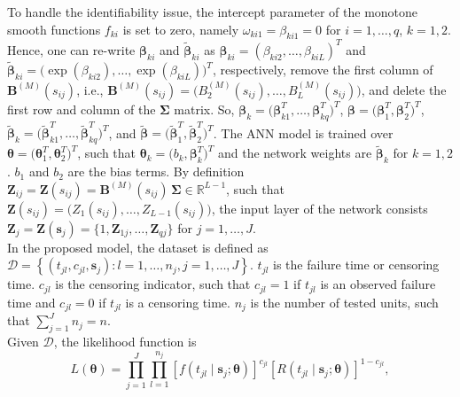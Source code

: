 \documentclass[twoside]{article}
\begin{document}
To handle the identifiability issue, the intercept parameter of the monotone smooth functions $f_{ki}$ is set to zero, namely $\omega_{ki1}=\beta_{ki1}=0$ for $i=1,\ldots,q$, $k=1,2$. Hence, one can re-write $\boldsymbol{\beta}_{ki}$ and $\tilde{\boldsymbol{\beta}}_{ki}$ as $\boldsymbol{\beta}_{ki}=(\beta_{ki2},\ldots,\beta_{kiL})^{T}$ and $\tilde{\boldsymbol{\beta}}_{ki}=\big(\exp(\beta_{ki2}),\ldots,\exp(\beta_{kiL})\big)^{T}$, respectively, remove the first column of $\boldsymbol{B}^{(M)}(s_{ij})$, i.e., $\boldsymbol{B}^{(M)}(s_{ij})=\big(B^{(M)}_{2}(s_{ij}),\ldots,B^{(M)}_{L}(s_{ij})\big)$, and delete the first row and column of the $\boldsymbol{\Sigma}$ matrix. So, $\boldsymbol{\beta}_{k}=\big(\boldsymbol{\beta}^{T}_{k1},\ldots,\boldsymbol{\beta}^{T}_{kq}\big)^{T}$, $\boldsymbol{\beta}=\big(\boldsymbol{\beta}^{T}_{1},\boldsymbol{\beta}^{T}_{2}\big)^{T}$, $\tilde{\boldsymbol{\beta}}_{k}=\big(\tilde{\boldsymbol{\beta}}^{T}_{k1},\ldots,\tilde{\boldsymbol{\beta}}^{T}_{kq}\big)^{T}$, and $\tilde{\boldsymbol{\beta}}=\big(\tilde{\boldsymbol{\beta}}^{T}_{1},\tilde{\boldsymbol{\beta}}^{T}_{2}\big)^{T}$. The ANN model is trained over $\boldsymbol{\theta}=\big(\boldsymbol{\theta}_{1}^{T}, \boldsymbol{\theta}_{2}^{T}\big)^{T}$, such that $\boldsymbol{\theta}_{k}=\big(b_{k}, \boldsymbol{\beta}^{T}_{k}\big)^{T}$ and the network weights are $\tilde{\boldsymbol{\beta}}_{k}$ for $k=1,2$. $b_{1}$ and $b_{2}$ are the bias terms. By definition $\boldsymbol{Z}_{ij} = \boldsymbol{Z}(s_{ij})=\boldsymbol{B}^{(M)}(s_{ij})\, \boldsymbol{\Sigma} \in \mathbb{R}^{L-1}$, such that $\boldsymbol{Z}(s_{ij}) = \big(Z_{1}(s_{ij}), \ldots, Z_{L-1}(s_{ij})\big)$, the input layer of the network consists $\boldsymbol{Z}_{j} = \boldsymbol{Z}(\boldsymbol{s}_{j})=\big\{1,\boldsymbol{Z}_{1j},\ldots,\boldsymbol{Z}_{qj}\big\}$ for $j=1,\ldots,J$.\\
In the proposed model, the dataset is defined as $\mathcal{D} = \left\{\left(t_{jl}, c_{jl}, \boldsymbol{s}_{j}\right): l=1,\ldots,n_{j}, j=1,\ldots, J\right\}$. $t_{jl}$ is the failure time or censoring time. $c_{jl}$ is the censoring indicator, such that $c_{jl} = 1$ if $t_{jl}$ is an observed failure time and $c_{jl} = 0$ if $t_{jl}$ is a censoring time. $n_{j}$ is the number of tested units, such that $\sum_{j=1}^{J}n_{j} = n$.\\
Given $\mathcal{D}$, the likelihood function is
\begin{equation}\label{eq2.5}
L(\boldsymbol{\theta}) = \prod_{j=1}^{J} \prod_{l=1}^{n_{j}} \left[f\left(t_{jl} \mid \boldsymbol{s}_{j}; \boldsymbol{\theta}\right)\right]^{c_{jl}} \left[R\left(t_{jl} \mid \boldsymbol{s}_{j}; \boldsymbol{\theta}\right)\right]^{1-c_{jl}}, 
\end{equation}
\end{document}
